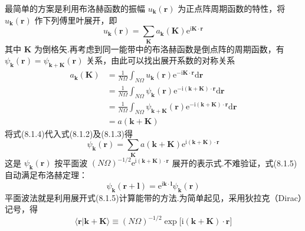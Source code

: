 最简单的方案是利用布洛赫函数的振幅 $u_{\boldsymbol{k}}(\boldsymbol{r})$ 为正点阵周期函数的特性，将 $u_{\boldsymbol{k}}(\boldsymbol{r})$ 作下列傅里叶展开，即
\begin{equation}
  u_{\boldsymbol{k}}(\boldsymbol{r})=\sum_{\boldsymbol{K}}a_{\boldsymbol{k}}(\boldsymbol{K})\mathrm{e}^{\mathrm{i}\boldsymbol{K}\cdot\boldsymbol{r}}
\end{equation}
其中 $\boldsymbol{K}$ 为倒格矢.再考虑到同一能带中的布洛赫函数是倒点阵的周期函数，有 $\psi_{\boldsymbol{k}}(\boldsymbol{r})=\psi_{\boldsymbol{k}+\boldsymbol{K}}(\boldsymbol{r})$ 关系，由此可以找出展开系数的对称关系
\begin{equation}
\begin{aligned}
  a_{\boldsymbol{k}}(\boldsymbol{K})
  &=\frac{1}{N\Omega}\int_{N\Omega}u_{\boldsymbol{k}}(\boldsymbol{r})\mathrm{e}^{-\mathrm{i}\boldsymbol{K}\cdot\boldsymbol{r}}\mathrm{d}\boldsymbol{r}\\
  &=\frac{1}{N\Omega}\int_{N\Omega}\psi_{\boldsymbol{k}}(\boldsymbol{r})\mathrm{e}^{-\mathrm{i}(\boldsymbol{k}+\boldsymbol{K})\cdot\boldsymbol{r}}\mathrm{d}\boldsymbol{r}\\
  &=\frac{1}{N\Omega}\int_{N\Omega}\psi_{\boldsymbol{k}+\boldsymbol{K}}(\boldsymbol{r})\mathrm{e}^{-\mathrm{i}(\boldsymbol{k}+\boldsymbol{K})\cdot\boldsymbol{r}}\mathrm{d}\boldsymbol{r}\\
  &=a(\boldsymbol{k}+\boldsymbol{K})
\end{aligned}
\end{equation}
将式(8.1.4)代入式(8.1.2)及(8.1.3)得
\begin{equation}
  \psi_{\boldsymbol{k}}(\boldsymbol{r})=\sum_{\boldsymbol{K}}a(\boldsymbol{k}+\boldsymbol{K})\mathrm{e}^{\mathrm{i}(\boldsymbol{k}+\boldsymbol{K})\cdot\boldsymbol{r}}
\end{equation}
这是 $\psi_{\boldsymbol{k}}(\boldsymbol{r})$ 按平面波 $(N\Omega)^{-1/2}\mathrm{e}^{\mathrm{i}(\boldsymbol{k}+\boldsymbol{K})\cdot\boldsymbol{r}}$ 展开的表示式.不难验证，式(8.1.5)自动满足布洛赫定理：
\begin{equation}
  \psi_{\boldsymbol{k}}(\boldsymbol{r}+\boldsymbol{l})=\mathrm{e}^{\mathrm{i}\boldsymbol{k}\cdot\boldsymbol{l}}\psi_{\boldsymbol{k}}(\boldsymbol{r})
\end{equation}
平面波法就是利用展开式(8.1.5)计算能带的方法.为简单起见，采用狄拉克（Dirac）记号，得
\begin{equation}
  \langle\boldsymbol{r}|\boldsymbol{k}+\boldsymbol{K}\rangle\equiv(N\Omega)^{-1/2}\exp\bigl[\mathrm{i}(\boldsymbol{k}+\boldsymbol{K})\cdot\boldsymbol{r}\bigr]
\end{equation}
